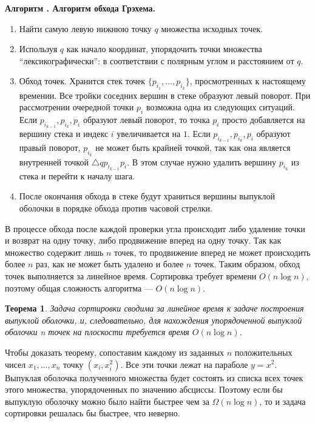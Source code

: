 \documentclass[a4paper]{article}
\newcounter{algorithm}
\newenvironment{algorithm}[1]{\par\smallskip\noindent\refstepcounter{algorithm}%
  \textbf{Алгоритм \arabic{algorithm}. #1}\begin{enumerate}}{\end{enumerate}}
\newtheorem{theorem}{Теорема}
\begin{document}
\begin{algorithm}{Алгоритм обхода Грэхема.}
\item Найти самую левую нижнюю точку $q$ множества исходных точек.
\item Используя $q$ как начало координат, упорядочить точки множества
  ``лексикографически'': в соответствии с полярным углом и расстоянием
  от $q$.
\item Обход точек. Хранится стек точек $\{p_{i_1}, \ldots,p_{i_k}\}$,
  просмотренных к настоящему времении. Все тройки соседних вершин в
  стеке образуют левый поворот. При рассмотрении очередной точки $p_i$
  возможна одна из следующих ситуаций. Если $p_{i_{k-1}},p_{i_k},p_i$
  образуют левый поворот, то точка $p_i$ просто добавляется на вершину
  стека и индекс $i$ увеличивается на $1$.
  Если $p_{i_{k-1}},p_{i_k},p_i$ образуют правый поворот, $p_{i_k}$ не
  может быть крайней точкой, так как она является внутренней точкой
  $\triangle qp_{i_{k-1}}p_i$. В этом случае нужно удалить вершину
  $p_{i_k}$ из стека и перейти к началу шага.
\item После окончания обхода в стеке будут храниться вершины выпуклой
  оболочки в порядке обхода против часовой стрелки.
\end{algorithm}

В процессе обхода после каждой проверки угла происходит либо удаление
точки и возврат на одну точку, либо продвижение вперед на одну точку.
Так как множество содержит лишь $n$ точек, то продвижение вперед не
может происходить более $n$ раз, как не может быть удалено и более $n$
точек. Таким образом, обход точек выполняется за линейное время.
Сортировка требует времени $O(n\log n)$, поэтому общая сложность
алгоритма --- $O(n\log n)$.

\begin{theorem}
  Задача сортировки сводима за линейное время к задаче построения
  выпуклой оболочки, и, следовательно, для нахождения упорядоченной
  выпуклой оболочки n точек на плоскости требуется время $O(n \log n)$.
\end{theorem}

Чтобы доказать теорему, сопоставим каждому из заданных $n$
положительных чисел $x_1, \ldots, x_n$ точку $(x_i, x_i^2)$. Все эти
точки лежат на параболе $y=x^2$. Выпуклая оболочка полученного
множества будет состоять из списка всех точек этого множества,
упорядоченных по значению абсциссы. Поэтому если бы выпуклую оболочку
можно было найти быстрее чем за $\Omega(n\log n)$, то и задача
сортировки решалась бы быстрее, что неверно.
\end{document}
